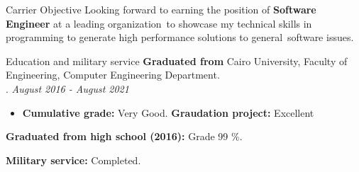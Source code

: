 \documentclass{resume}
\begin{document}

\begin{rSection}{Carrier Objective}
  Looking forward to earning the position of \textbf{Software Engineer} at a leading organization\
  to showcase my technical skills in programming to generate high performance solutions to general\
  software issues.
\end{rSection}


\begin{rSection}{Education and military service}
  \textbf{Graduated from} Cairo University, Faculty of Engineering, Computer Engineering Department.\\ . \hfill {\em August 2016 - August 2021}
  \begin{itemize}
    \item \textbf{Cumulative grade:} Very Good. \textbf{Graudation project:} Excellent\\
  \end{itemize}

  \textbf{Graduated from high school (2016):} Grade 99 \%.

  \textbf{Military service:} Completed.

\end{rSection}

\end{document}
